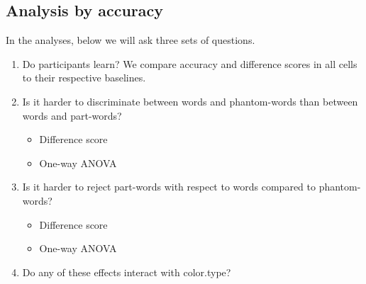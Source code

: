 \documentclass[
]{article}
\providecommand{\tightlist}{%
  \setlength{\itemsep}{0pt}\setlength{\parskip}{0pt}}
\begin{document}
\hypertarget{analysis-by-accuracy}{%
\subsection{Analysis by accuracy}\label{analysis-by-accuracy}}

In the analyses, below we will ask three sets of questions.

\begin{enumerate}
\def\labelenumi{\arabic{enumi}.}
\tightlist
\item
  Do participants learn? We compare accuracy and difference scores in
  all cells to their respective baselines.
\item
  Is it harder to discriminate between words and phantom-words than
  between words and part-words?

  \begin{itemize}
  \tightlist
  \item
    Difference score
  \item
    One-way ANOVA
  \end{itemize}
\item
  Is it harder to reject part-words with respect to words compared to
  phantom-words?

  \begin{itemize}
  \tightlist
  \item
    Difference score
  \item
    One-way ANOVA
  \end{itemize}
\item
  Do any of these effects interact with color.type?
\end{enumerate}
\end{document}
